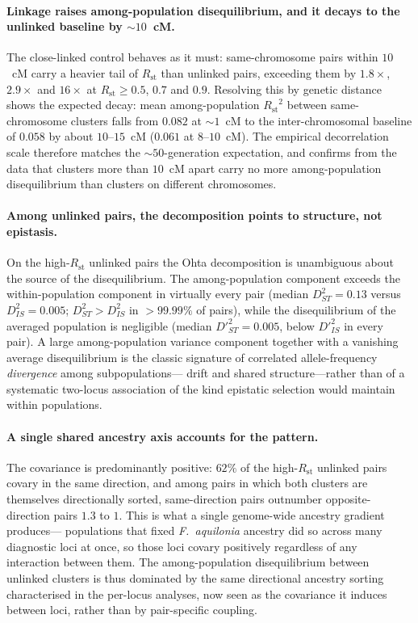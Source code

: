 \documentclass[11pt]{article}
\newcommand{\Faq}{\textit{F.~aquilonia}}
\newcommand{\Rst}{\ensuremath{R_{\mathrm{st}}}}
\begin{document}
\paragraph{Linkage raises among-population disequilibrium, and it decays to the
unlinked baseline by $\sim\!10$~cM.} The close-linked control behaves as it must:
same-chromosome pairs within $10$~cM carry a heavier tail of \Rst{} than unlinked
pairs, exceeding them by $1.8\times$, $2.9\times$ and $16\times$ at
$\Rst \ge 0.5$, $0.7$ and $0.9$. Resolving this by genetic distance shows the
expected decay: mean among-population $\Rst^2$ between same-chromosome clusters
falls from $0.082$ at $\sim\!1$~cM to the inter-chromosomal baseline of $0.058$ by
about $10$--$15$~cM ($0.061$ at $8$--$10$~cM). The empirical decorrelation scale
therefore matches the $\sim\!50$-generation expectation, and confirms from the data
that clusters more than $10$~cM apart carry no more among-population disequilibrium
than clusters on different chromosomes.

\paragraph{Among unlinked pairs, the decomposition points to structure, not
epistasis.} On the high-\Rst{} unlinked pairs the Ohta decomposition is unambiguous
about the source of the disequilibrium. The among-population component exceeds the
within-population component in virtually every pair (median $D^2_{ST} = 0.13$
versus $D^2_{IS} = 0.005$; $D^2_{ST} > D^2_{IS}$ in $>99.99\%$ of pairs), while the
disequilibrium of the averaged population is negligible (median
$D'^2_{ST} = 0.005$, below $D'^2_{IS}$ in every pair). A large among-population
variance component together with a vanishing average disequilibrium is the classic
signature of correlated allele-frequency \emph{divergence} among subpopulations---
drift and shared structure---rather than of a systematic two-locus association of
the kind epistatic selection would maintain within populations.

\paragraph{A single shared ancestry axis accounts for the pattern.}
The covariance is predominantly positive: $62\%$ of the high-\Rst{} unlinked pairs
covary in the same direction, and among pairs in which both clusters are themselves
directionally sorted, same-direction pairs outnumber opposite-direction pairs
$1.3$ to $1$. This is what a single genome-wide ancestry gradient produces---
populations that fixed \Faq{} ancestry did so across many diagnostic loci at once,
so those loci covary positively regardless of any interaction between them. The
among-population disequilibrium between unlinked clusters is thus dominated by the
same directional ancestry sorting characterised in the per-locus analyses, now seen
as the covariance it induces between loci, rather than by pair-specific coupling.
\end{document}
